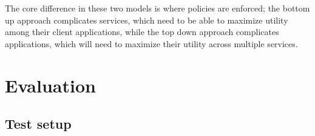 \documentclass[letterpaper,twocolumn,11pt]{article}
\begin{document}
The core difference in these two models is where policies are enforced; the bottom up approach complicates services, which need to be able to maximize utility among their client applications, while the top down approach complicates applications, which will need to maximize their utility across multiple services.

\section{Evaluation}

\subsection{Test setup}

\begin{figure}[t]
  \begin{center}
     \\

\end{center}
\end{figure}
\end{document}
